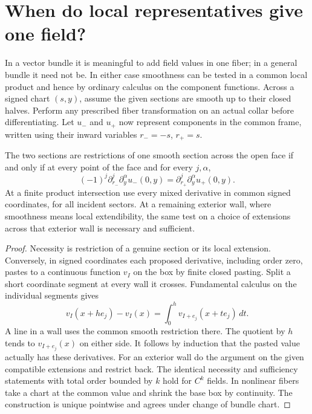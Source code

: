 \section{When do local representatives give one field?}
In a vector bundle it is meaningful to add field values in one fiber; in a general bundle it need not be. In either case smoothness can be tested in a common local product and hence by ordinary calculus on the component functions. Across a signed chart $(s,y)$, assume the given sections are smooth up to their closed halves. Perform any prescribed fiber transformation on an actual collar before differentiating. Let $u_-$ and $u_+$ now represent components in the common frame, written using their inward variables $r_-=-s$, $r_+=s$.
\begin{proposition}\label{f:jet-pasting}
The two sections are restrictions of one smooth section across the open face if and only if at every point of the face and for every $j,\alpha$,
\[
 (-1)^j\partial_{r_-}^{j}\partial_y^\alpha u_-(0,y)=\partial_{r_+}^{j}\partial_y^\alpha u_+(0,y).
\]
At a finite product intersection use every mixed derivative in common signed coordinates, for all incident sectors. At a remaining exterior wall, where smoothness means local extendibility, the same test on a choice of extensions across that exterior wall is necessary and sufficient.
\end{proposition}
\begin{proof}
Necessity is restriction of a genuine section or its local extension. Conversely, in signed coordinates each proposed derivative, including order zero, pastes to a continuous function $v_I$ on the box by finite closed pasting. Split a short coordinate segment at every wall it crosses. Fundamental calculus on the individual segments gives
\[
 v_I(x+he_j)-v_I(x)=\int_0^h v_{I+e_j}(x+te_j)\,dt .
\]
A line in a wall uses the common smooth restriction there. The quotient by $h$ tends to $v_{I+e_j}(x)$ on either side. It follows by induction that the pasted value actually has these derivatives. For an exterior wall do the argument on the given compatible extensions and restrict back. The identical necessity and sufficiency statements with total order bounded by $k$ hold for $C^k$ fields. In nonlinear fibers take a chart at the common value and shrink the base box by continuity. The construction is unique pointwise and agrees under change of bundle chart.
\end{proof}

